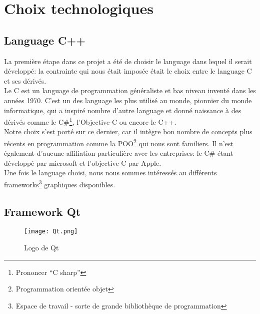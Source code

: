 \chapter{Choix technologiques}
    \section{Language C++}
        La première étape dans ce projet a été de choisir le language dans lequel il serait développé: la contrainte qui nous était imposée 
        était le choix entre le language C et ses dérivés.
        \\ Le C est un language de programmation généraliste et bas niveau inventé dans les années 1970. C'est un des language les plus utilisé 
        au monde, pionnier du monde informatique, qui a inspiré nombre d'autre language et donné naissance à des dérivés comme le C\#\footnote{Prononcer ``C sharp''}, 
        l'Objective-C ou encore le C++.
        \\ Notre choix s'est porté sur ce dernier, car il intègre bon nombre de concepts plus récents en programmation comme la POO\footnote{Programmation
        orientée objet} qui nous sont familiers. Il n'est également d'aucune affiliation particulière avec les entreprises: le C\# étant développé par microsoft
        et l'objective-C par Apple.
        \\ Une fois le language choisi, nous nous sommes intéressés au différents frameworks\footnote{Espace de travail - sorte de grande bibliothèque 
        de programmation}
        graphiques disponibles.


    \section{Framework Qt}
        \begin{figure}[h]
            \begin{center}
                \texttt{[image: Qt.png]}
            \end{center}

            \caption{Logo de Qt}
            \label{Qt}
        \end{figure}

